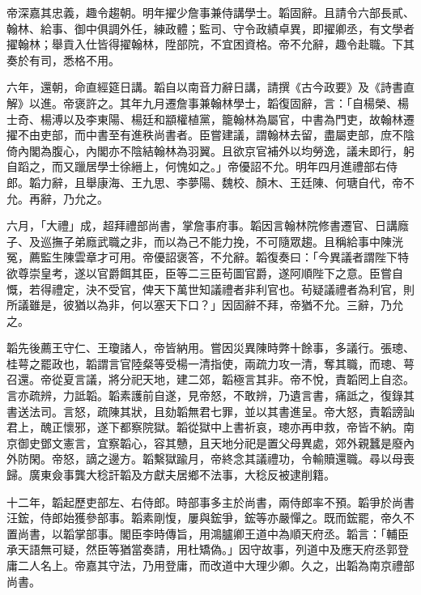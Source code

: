 \begin{pinyinscope}
帝深嘉其忠義，趣令趨朝。明年擢少詹事兼侍講學士。韜固辭。且請令六部長貳、翰林、給事、御中俱調外任，練政體；監司、守令政績卓異，即擢卿丞，有文學者擢翰林；舉貢入仕皆得擢翰林，陞部院，不宜困資格。帝不允辭，趣令赴職。下其奏於有司，悉格不用。

六年，還朝，命直經筵日講。韜自以南音力辭日講，請撰《古今政要》及《詩書直解》以進。帝褒許之。其年九月遷詹事兼翰林學士，韜復固辭，言：「自楊榮、楊士奇、楊溥以及李東陽、楊廷和顓權植黨，籠翰林為屬官，中書為門吏，故翰林遷擢不由吏部，而中書至有進秩尚書者。臣嘗建議，謂翰林去留，盡屬吏部，庶不陰倚內閣為腹心，內閣亦不陰結翰林為羽翼。且欲京官補外以均勞逸，議未即行，躬自蹈之，而又躐居學士徐縉上，何愧如之。」帝優詔不允。明年四月進禮部右侍郎。韜力辭，且舉康海、王九思、李夢陽、魏校、顏木、王廷陳、何瑭自代，帝不允。再辭，乃允之。

六月，「大禮」成，超拜禮部尚書，掌詹事府事。韜因言翰林院修書遷官、日講廕子、及巡撫子弟廕武職之非，而以為己不能力挽，不可隨眾趨。且稱給事中陳洸冤，薦監生陳雲章才可用。帝優詔褒答，不允辭。韜復奏曰：「今異議者謂陛下特欲尊崇皇考，遂以官爵餌其臣，臣等二三臣茍圖官爵，遂阿順陛下之意。臣嘗自慨，若得禮定，決不受官，俾天下萬世知議禮者非利官也。茍疑議禮者為利官，則所議雖是，彼猶以為非，何以塞天下口？」因固辭不拜，帝猶不允。三辭，乃允之。

韜先後薦王守仁、王瓊諸人，帝皆納用。嘗因災異陳時弊十餘事，多議行。張璁、桂萼之罷政也，韜謂言官陸粲等受楊一清指使，兩疏力攻一清，奪其職，而璁、萼召還。帝從夏言議，將分祀天地，建二郊，韜極言其非。帝不悅，責韜罔上自恣。言亦疏辨，力詆韜。韜素護前自遂，見帝怒，不敢辨，乃遺言書，痛詆之，復錄其書送法司。言怒，疏陳其狀，且劾韜無君七罪，並以其書進呈。帝大怒，責韜謗訕君上，醜正懷邪，遂下都察院獄。韜從獄中上書祈哀，璁亦再申救，帝皆不納。南京御史鄧文憲言，宜察韜心，容其戇，且天地分祀是置父母異處，郊外親蠶是廢內外防閑。帝怒，謫之邊方。韜繫獄踰月，帝終念其議禮功，令輸贖還職。尋以母喪歸。廣東僉事龔大稔訐韜及方獻夫居鄉不法事，大稔反被逮削籍。

十二年，韜起歷吏部左、右侍郎。時部事多主於尚書，兩侍郎率不預。韜爭於尚書汪鋐，侍郎始獲參部事。韜素剛愎，屢與鋐爭，鋐等亦嚴憚之。既而鋐罷，帝久不置尚書，以韜掌部事。閣臣李時傳旨，用鴻臚卿王道中為順天府丞。韜言：「輔臣承天語無可疑，然臣等猶當奏請，用杜矯偽。」因守故事，列道中及應天府丞郭登庸二人名上。帝嘉其守法，乃用登庸，而改道中大理少卿。久之，出韜為南京禮部尚書。


\end{pinyinscope}
